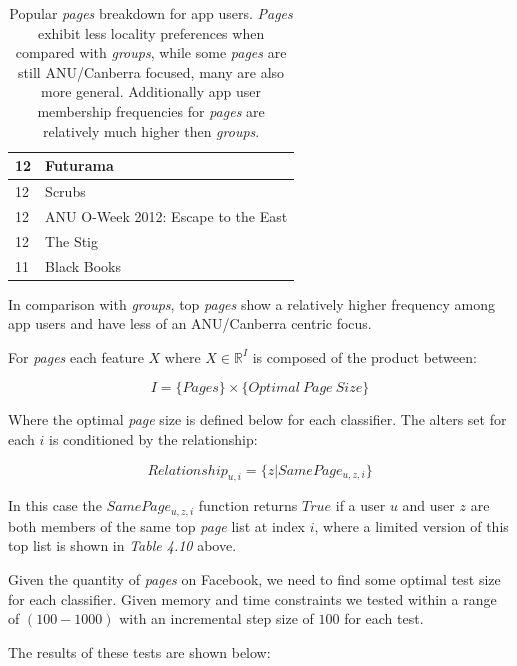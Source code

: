 \begin{table}[!htbp]
\begin{tabular}{|l|l|}
		12 & \small{Futurama} \\ \hline
		12 & \small{Scrubs} \\ \hline
		12 & \small{ANU O-Week 2012: Escape to the East} \\ \hline
		12 & \small{The Stig} \\ \hline
		11 & \small{Black Books} \\ \hline
	\end{tabular}
	\caption{Popular \emph{pages} breakdown for app users. \emph{Pages} exhibit less locality preferences when compared with \emph{groups},
			 while some \emph{pages} are still ANU/Canberra focused, many are also more general. Additionally app user membership frequencies for \emph{pages} are 
			 relatively much higher then \emph{groups}.}
	\label{tab:revpol}
\end{table}

In comparison with \emph{groups}, top \emph{pages} show a relatively higher frequency among app users and 
have less of an ANU/Canberra centric focus.

For \emph{pages} each feature $X$ where $X \in \mathbb{R}^I$ is composed of the product between:

\[ I = \{Pages\} \times \{Optimal \ Page \ Size\} \]

Where the optimal \emph{page} size is defined below for each classifier. 
The alters set for each $i$ is conditioned by the relationship:

\[ Relationship_{u,i} = \{z | SamePage_{u,z,i}\} \]

In this case the $SamePage_{u,z,i}$ function returns $True$ if a user $u$ and user $z$ are both members of the same top \emph{page} list at index $i$, 
where a limited version of this top list is shown in \emph{Table 4.10} above.

Given the quantity of \emph{pages} on Facebook, we need to find some optimal test size for each classifier. Given memory and time constraints we tested 
within a range of $(100-1000)$ with an incremental step size of $100$ for each test.

The results of these tests are shown below:

